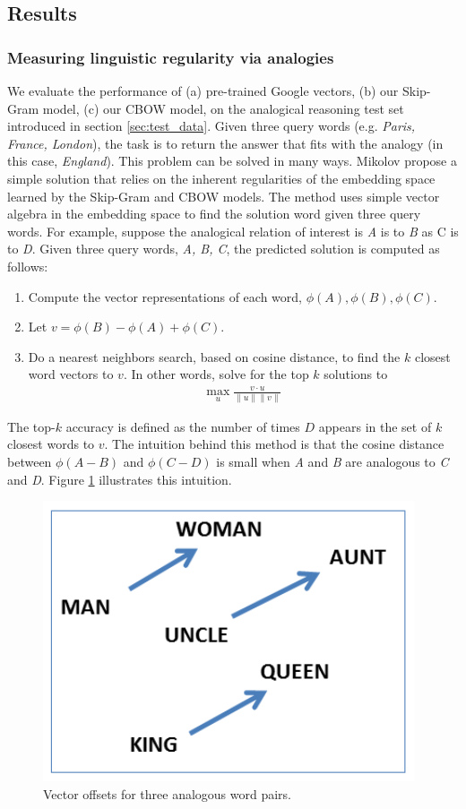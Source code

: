 \subsection{Results}

\subsubsection{Measuring linguistic regularity via analogies}
We evaluate the performance of (a) pre-trained Google vectors, (b) our Skip-Gram model, (c) our CBOW model, on the analogical reasoning test set introduced in section \ref{sec:test_data}. Given three query words (e.g. {\it Paris, France, London}), the task is to return the answer that fits with the analogy (in this case, {\it England}). This problem can be solved in many ways. Mikolov \etal \cite{mikolov1} propose a simple solution that relies on the inherent regularities of the embedding space learned by the Skip-Gram and CBOW models. The method uses simple vector algebra in the embedding space to find the solution word given three query words. For example, suppose the analogical relation of interest is {\it A} is to {\it B} as {\it} C is to {\it D}. Given three query words, {\it A, B, C}, the predicted solution is computed as follows:
\begin{enumerate}
\item Compute the vector representations of each word, $\phi(A), \phi(B), \phi(C)$.
\item Let $v = \phi(B) - \phi(A) + \phi(C)$.
\item Do a nearest neighbors search, based on cosine distance, to find the $k$ closest word vectors to $v$. In other words, solve for the top $k$ solutions to 
	\begin{align} \max_u\frac{ v \cdot u}{\| u \| \| v \|}\ \end{align}
\end{enumerate}

The top-$k$ accuracy is defined as the number of times $D$ appears in the set of $k$ closest words to $v$. The intuition behind this method is that the cosine distance between $\phi(A - B)$ and $\phi(C - D)$ is small when {\it A} and {\it B} are analogous to {\it C} and {\it D}. Figure \ref{fig:offsets} illustrates this intuition. 

\begin{figure}[h]
\centering
\includegraphics[width=.45\textwidth]{./images/king_queen.png}
\caption{Vector offsets for three analogous word pairs.}
\label{fig:offsets}
\end{figure}

